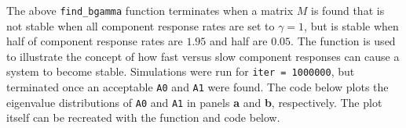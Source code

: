 \documentclass[]{article}
\newenvironment{Shaded}{\begin{snugshade}}{\end{snugshade}}
\newcommand{\KeywordTok}[1]{\textcolor[rgb]{0.13,0.29,0.53}{\textbf{{#1}}}}
\newcommand{\DecValTok}[1]{\textcolor[rgb]{0.00,0.00,0.81}{{#1}}}
\newcommand{\FloatTok}[1]{\textcolor[rgb]{0.00,0.00,0.81}{{#1}}}
\newcommand{\StringTok}[1]{\textcolor[rgb]{0.31,0.60,0.02}{{#1}}}
\newcommand{\OtherTok}[1]{\textcolor[rgb]{0.56,0.35,0.01}{{#1}}}
\newcommand{\NormalTok}[1]{{#1}}
\begin{document}
The above \texttt{find\_bgamma} function terminates when a matrix \(M\)
is found that is not stable when all component response rates are set to
\(\gamma = 1\), but is stable when half of component response rates are
\(1.95\) and half are \(0.05\). The function is used to illustrate the
concept of how fast versus slow component responses can cause a system
to become stable. Simulations were run for \texttt{iter\ =\ 1000000},
but terminated once an acceptable \texttt{A0} and \texttt{A1} were
found. The code below plots the eigenvalue distributions of \texttt{A0}
and \texttt{A1} in panels \textbf{a} and \textbf{b}, respectively. The
plot itself can be recreated with the function and code below.

\begin{Shaded}
\end{Shaded}
\end{document}
